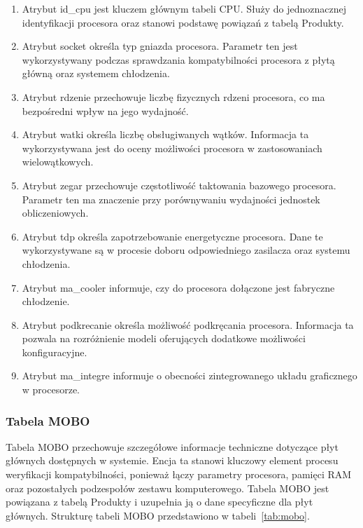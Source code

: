 \documentclass[a4paper,twoside,12pt]{book}
\begin{document}
\begin{enumerate}
    \item Atrybut id\_cpu jest kluczem głównym tabeli CPU. Służy do jednoznacznej
    identyfikacji procesora oraz stanowi podstawę powiązań z tabelą Produkty.

    \item Atrybut socket określa typ gniazda procesora. Parametr ten jest
    wykorzystywany podczas sprawdzania kompatybilności procesora z płytą główną
    oraz systemem chłodzenia.

    \item Atrybut rdzenie przechowuje liczbę fizycznych rdzeni procesora, co ma
    bezpośredni wpływ na jego wydajność.

    \item Atrybut watki określa liczbę obsługiwanych wątków. Informacja ta
    wykorzystywana jest do oceny możliwości procesora w zastosowaniach
    wielowątkowych.

    \item Atrybut zegar przechowuje częstotliwość taktowania bazowego procesora.
    Parametr ten ma znaczenie przy porównywaniu wydajności jednostek
    obliczeniowych.

    \item Atrybut tdp określa zapotrzebowanie energetyczne procesora. Dane te
    wykorzystywane są w procesie doboru odpowiedniego zasilacza oraz systemu
    chłodzenia.

    \item Atrybut ma\_cooler informuje, czy do procesora dołączone jest fabryczne
    chłodzenie.

    \item Atrybut podkrecanie określa możliwość podkręcania procesora. Informacja
    ta pozwala na rozróżnienie modeli oferujących dodatkowe możliwości
    konfiguracyjne.

    \item Atrybut ma\_integre informuje o obecności zintegrowanego układu
    graficznego w procesorze.
\end{enumerate}
\subsubsection{Tabela MOBO}
Tabela MOBO przechowuje szczegółowe informacje techniczne dotyczące płyt głównych
dostępnych w systemie. Encja ta stanowi kluczowy element procesu weryfikacji
kompatybilności, ponieważ łączy parametry procesora, pamięci RAM oraz pozostałych
podzespołów zestawu komputerowego. Tabela MOBO jest powiązana z tabelą Produkty
i uzupełnia ją o dane specyficzne dla płyt głównych. Strukturę tabeli MOBO
przedstawiono w tabeli~\ref{tab:mobo}.
\end{document}
